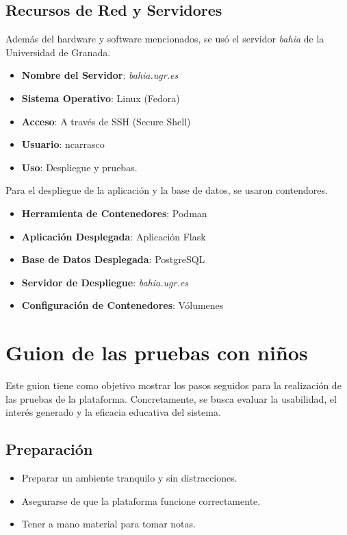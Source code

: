 \begin{appendices}
\section{Recursos de Red y Servidores}

Además del hardware y software mencionados, se usó el servidor \textit{bahia} de la Universidad de Granada.

\begin{itemize}
    \item \textbf{Nombre del Servidor}: \textit{bahia.ugr.es}
    \item \textbf{Sistema Operativo}: Linux (Fedora)
    \item \textbf{Acceso}: A través de SSH (Secure Shell)
    \item \textbf{Usuario}: ncarrasco
    \item \textbf{Uso}: Despliegue y pruebas.
\end{itemize}

Para el despliegue de la aplicación y la base de datos, se usaron contendores. 

\begin{itemize}
    \item \textbf{Herramienta de Contenedores}: Podman
    \item \textbf{Aplicación Desplegada}: Aplicación Flask
    \item \textbf{Base de Datos Desplegada}: PostgreSQL
    \item \textbf{Servidor de Despliegue}: \textit{bahia.ugr.es}
    \item \textbf{Configuración de Contenedores}: Vólumenes
\end{itemize}


\chapter{Guion de las pruebas con niños} \label{chap:guion}

Este guion tiene como objetivo mostrar los pasos seguidos para la realización de las pruebas de la plataforma. Concretamente, se busca evaluar la usabilidad, el interés generado y la eficacia educativa del sistema.

\section{Preparación}
\begin{itemize}
    \item Preparar un ambiente tranquilo y sin distracciones.
    \item Asegurarse de que la plataforma funcione correctamente.
    \item Tener a mano material para tomar notas.
\end{itemize}


\end{appendices}
